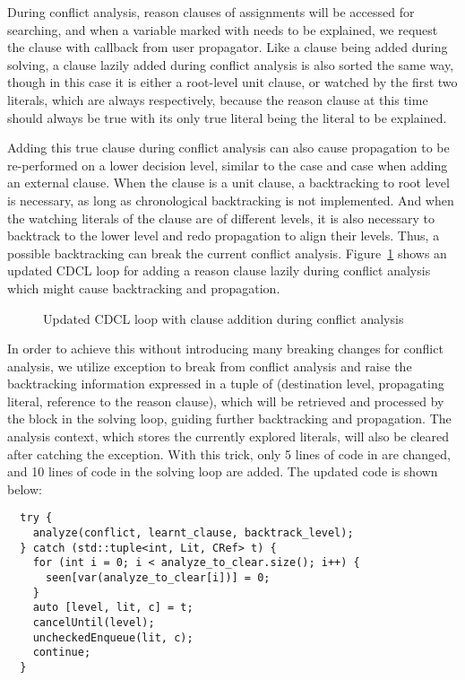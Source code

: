 During conflict analysis, reason clauses of assignments will be accessed for searching, and when a variable marked with  needs to be explained, we request the clause with callback  from user propagator. Like a clause being added during solving, a clause lazily added during conflict analysis is also sorted the same way, though in this case it is either a root-level unit clause, or watched by the first two literals, which are always  respectively, because the reason clause at this time should always be true with its only true literal being the literal to be explained.

Adding this true clause during conflict analysis can also cause propagation to be re-performed on a lower decision level, similar to the  case and  case when adding an external clause. When the clause is a unit clause, a backtracking to root level is necessary, as long as chronological backtracking is not implemented. And when the watching literals of the clause are of different levels, it is also necessary to backtrack to the lower level and redo propagation to align their levels. Thus, a possible backtracking can break the current conflict analysis. Figure~\ref{fig:analyze} shows an updated CDCL loop for adding a reason clause lazily during conflict analysis which might cause backtracking and propagation.

\begin{figure}[!htbp]
  \centering
  
  \caption{Updated CDCL loop with clause addition during conflict analysis}
  \label{fig:analyze}
\end{figure}

In order to achieve this without introducing many breaking changes for conflict analysis, we utilize  exception to break from conflict analysis and raise the backtracking information expressed in a tuple of (destination level, propagating literal, reference to the reason clause), which will be retrieved and processed by the  block in the solving loop, guiding further backtracking and propagation. The analysis context, which stores the currently explored literals, will also be cleared after catching the exception. With this trick, only 5 lines of code in  are changed, and 10 lines of code in the solving loop are added. The updated code is shown below:

\begin{lstlisting}
  try {
    analyze(conflict, learnt_clause, backtrack_level);
  } catch (std::tuple<int, Lit, CRef> t) {
    for (int i = 0; i < analyze_to_clear.size(); i++) {
      seen[var(analyze_to_clear[i])] = 0;
    }
    auto [level, lit, c] = t;
    cancelUntil(level);
    uncheckedEnqueue(lit, c);
    continue;
  }
\end{lstlisting}

